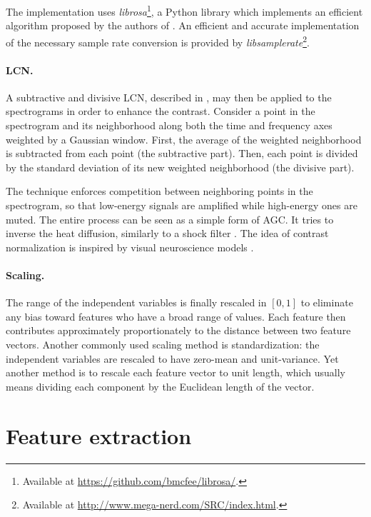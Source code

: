 The implementation uses \textit{librosa}\footnote{Available at \url{https://github.com/bmcfee/librosa/}.}, a Python library which implements an efficient algorithm proposed by the authors of \cite{schorkhuber2010CQTtoolbox}. An efficient and accurate implementation of the necessary sample rate conversion is provided by \textit{libsamplerate}\footnote{Available at \url{http://www.mega-nerd.com/SRC/index.html}.}.

\paragraph{\gls{LCN}.}
A subtractive and divisive \gls{LCN}, described in \cite{lecun2010LCN}, may then be applied to the spectrograms in order to enhance the contrast.
Consider a point in the spectrogram and its neighborhood along both the time and frequency axes weighted by a Gaussian window. First, the average of the weighted neighborhood is subtracted from each point (the subtractive part). Then, each point is divided by the standard deviation of its new weighted neighborhood (the divisive part).

The technique enforces competition between neighboring points in the spectrogram, so that low-energy signals are amplified while high-energy ones are muted. The entire process can be seen as a simple form of \gls{AGC}. It tries to inverse the heat diffusion, similarly to a shock filter \cite{osher1990shockFilters}. The idea of contrast normalization is inspired by visual neuroscience models \cite{lyu2008LCNneuro1, pinto2008LCNneuro2}.

\paragraph{Scaling.}
The range of the independent variables is finally rescaled in $[0,1]$ to eliminate any bias toward features who have a broad range of values. Each feature then contributes approximately proportionately to the distance between two feature vectors. Another commonly used scaling method is standardization: the independent variables are rescaled to have zero-mean and unit-variance. Yet another method is to rescale each feature vector to unit length, which usually means dividing each component by the Euclidean length of the vector.

\section{Feature extraction}

